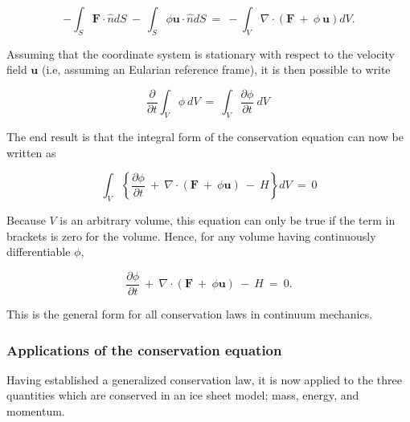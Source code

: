 \begin{equation}
-{ \int }_{ S} {\mathbf F} {\cdot} \hat{n}dS~ - ~{ \int }_{ S} \phi {\mathbf u}
    {\cdot}\hat{n} dS~ = ~ -{ \int }_{ V} \nabla {\cdot} \left ( {
    {\mathbf F}~ + ~ \phi ~ {\mathbf u}} \right )dV.
\end{equation}

Assuming that the coordinate system is stationary with respect to the velocity field $\mathbf{u}$ 
(i.e, assuming an Eularian reference frame), it is then possible to write

\begin{equation}
{\frac{ \partial}{ \partial t}} { \int }_{ V} \phi ~dV~ = ~{ \int }_{ V}
    {\frac{ \partial \phi }{ \partial t}} ~dV~
\end{equation}

The end result is that the integral form of the conservation equation can now be written as

\begin{equation}
{ \int }_{ V} \left\{ {{\frac{ \partial \phi }{ \partial t}}
    ~ + ~ \nabla {\cdot} \left ( { {\mathbf F}~ + ~ \phi {\mathbf u}} \right ) ~
    - ~ H} \right\} dV~ = ~ 0
\end{equation}

Because $V$ is an arbitrary volume, this equation can only be true if the term in brackets is zero 
for the volume. Hence, for any volume having continuously differentiable $\phi$,

\begin{equation}
{\frac{ \partial \phi }{ \partial t}} ~ + ~ \nabla {\cdot} 
    \left ( { {\mathbf F}~ + ~ \phi {\mathbf u}} \right ) ~ - ~H~ = ~ 0.
\end{equation}

This is the general form for all conservation laws in continuum mechanics.

\subsubsection{Applications of the conservation equation}

Having established a generalized conservation law, it is now applied to
the three quantities which are conserved in an ice sheet model; mass,
energy, and momentum.






